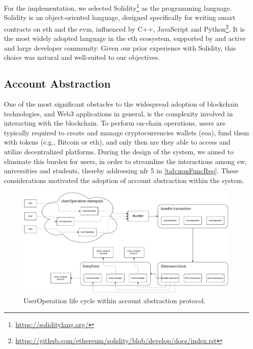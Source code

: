 For the implementation, we selected Solidity\footnote{\url{https://soliditylang.org/}} as the programming language. Solidity is an object-oriented language, designed specifically for writing smart contracts on \acrlong{eth} and the \acrshort{evm}, influenced by C++, JavaScript and Python\footnote{\url{https://github.com/ethereum/solidity/blob/develop/docs/index.rst}}. It is the most widely adopted language in the \acrlong{eth} ecosystem, supported by and active and large developer community. Given our prior experience with Solidity, this choice was natural and well-suited to our objectives.

\subsection{Account Abstraction}
\label{ssec:accountAbstraction}
One of the most significant obstacles to the widespread adoption of blockchain technologies, and Web3 applications in general, is the complexity involved in interacting with the blockchain. To perform on-chain operations, users are typically required to create and manage cryptocurrencies wallets (\acrfull{eoa}), fund them with tokens (e.g., Bitcoin or \acrlong{eth}), and only then are they able to access and utilize decentralized platforms. During the design of the system, we aimed to eliminate this burden for users, in order to streamline the interactions among \acrlong{ew}, universities and students, thereby addressing \acrshort{nfr} 5 in \cref{tab:nonFuncReq}. These considerations motivated the adoption of account abstraction within the system.

\begin{figure}
  \centering
  \includegraphics[width=1\textwidth]{figures/Account Abstraction.pdf}
  \caption[UserOperation life cycle within account abstraction protocol]{UserOperation life cycle within account abstraction protocol.}
  \label{fig:accountAbstraction}
\end{figure}

